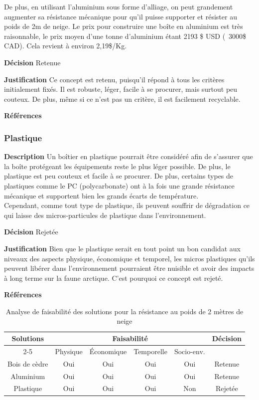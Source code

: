 De plus, en utilisant l'aluminium sous forme d'alliage, on peut grandement augmenter sa résistance mécanique pour qu'il puisse supporter et résister au poids de 2m de neige. Le prix pour construire une boîte en aluminium est très raisonnable, le prix moyen d'une tonne d'aluminium étant 2193 \$ USD (~3000\$ CAD). Cela revient à environ 2,19\$/Kg.
\smallskip

\noindent\textbf{Décision} Retenue
\smallskip

\noindent\textbf{Justification} Ce concept est retenu, puisqu'il répond à tous les critères initialement fixés. Il est robuste, léger, facile à se procurer, mais surtout peu couteux. De plus, même si ce n'est pas un critère, il est facilement recyclable.
\smallskip

\noindent\textbf{Références} 
\cite{Aluminium1}
\cite{Aluminium2}

\subsubsection{Plastique}
\label{sec:plast}
\noindent\textbf{Description} Un boîtier en plastique pourrait être considéré afin de s'assurer que la boîte protégeant les équipements reste le plus léger possible. De plus, le plastique est peu couteux et facile à se procurer. De plus, certains types de plastiques comme le PC (polycarbonate) ont à la fois une grande résistance mécanique et supportent bien les grands écarts de température. 
\\

Cependant, comme tout type de plastique, ils peuvent souffrir de dégradation ce qui laisse des micros-particules de plastique dans l'environnement. 
\smallskip

\noindent\textbf{Décision} Rejetée
\smallskip

\noindent\textbf{Justification} Bien que le plastique serait en tout point un bon candidat aux niveaux des aspects physique, économique et temporel, les micros plastiques qu'ils peuvent libérer dans l'environnement pourraient être nuisible et avoir des impacts à long terme sur la faune arctique. C'est pourquoi ce concept est rejeté.
\smallskip

\noindent\textbf{Références} 
\cite{Plastique1}

\begin{table}[H]
    \centering
\begin{tabular}{|c|c|c|c|c|c|}
    \hline
    \centering
    \textbf{Solutions} & \multicolumn{4}{c|}{Faisabilité} & \textbf{Décision} \\
    \cline{2-5}
    & Physique & Économique & Temporelle & Socio-env. & \\
    \hline
    Bois de cèdre & Oui & Oui & Oui & Oui & Retenue \\
    \hline
    Aluminium & Oui & Oui & Oui & Oui & Retenue \\
    \hline
    Plastique & Oui & Oui & Oui & Non & Rejetée \\
    \hline
\end{tabular}
\caption{Analyse de faisabilité des solutions pour la résistance au poids de 2 mètres de neige}
\label{tab:faisabiliteMateriaux}
\end{table}


